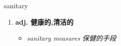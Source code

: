
\begin{frame}
{\huge sanitary}
\begin{center}
\begin{enumerate}\Large
  \item \textbf{adj. 健康的,清洁的}
  \begin{itemize}
    \item \em{\Large{sanitary measures 保健的手段}}
  \end{itemize}
\end{enumerate}
\end{center}
\end{frame}
